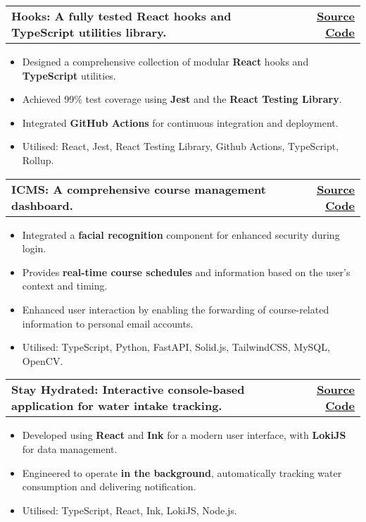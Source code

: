 \documentclass[a4paper,11pt]{article}
\makeatletter
\newcommand{\resumeItem}[1]{
  \item\small{
    {#1 \vspace{-2pt}}
  }
}
\newcommand{\resumeProjectHeading}[2]{
  \item
  \begin{tabular*}{1.001\textwidth}{l@{\extracolsep{\fill}}r}
    \small#1 & \textbf{\small #2}\\
  \end{tabular*}\vspace{-7pt}
}
\newcommand{\resumeItemListStart}{\begin{itemize}}
\newcommand{\resumeItemListEnd}{\end{itemize}\vspace{-5pt}}
\makeatother
\begin{document}
\resumeProjectHeading{\textbf{Hooks: A fully tested React hooks and TypeScript utilities library.}}{\href{https://github.com/chanyatfu/hooks}{\underline{Source Code}}}
\resumeItemListStart
\resumeItem{Designed a comprehensive collection of modular \textbf{React} hooks and \textbf{TypeScript} utilities.}
\resumeItem{Achieved 99\% test coverage using \textbf{Jest} and the \textbf{React Testing Library}.}
\resumeItem{Integrated \textbf{GitHub Actions} for continuous integration and deployment.}
\resumeItem{Utilised: React, Jest, React Testing Library, Github Actions, TypeScript, Rollup.}
\resumeItemListEnd
\vspace{-15pt}

\resumeProjectHeading{\textbf{ICMS: A comprehensive course management dashboard.}}{\href{https://github.com/chanyatfu/ICMS}{\underline{Source Code}}}
\resumeItemListStart
\resumeItem{Integrated a \textbf{facial recognition} component for enhanced security during login.}
\resumeItem{Provides \textbf{real-time course schedules} and information based on the user’s context and timing.}
\resumeItem{Enhanced user interaction by enabling the forwarding of course-related information to personal email accounts.}
\resumeItem{Utilised: TypeScript, Python, FastAPI, Solid.js, TailwindCSS, MySQL, OpenCV.}
\vspace{-15pt}
\resumeItemListEnd

\resumeProjectHeading{\textbf{Stay Hydrated: Interactive console-based application for water intake tracking.}}{\href{https://github.com/chanyatfu/stay-hydrated}{\underline{Source Code}}}
\resumeItemListStart
\resumeItem{Developed using \textbf{React} and \textbf{Ink} for a modern user interface, with \textbf{LokiJS} for data management.}
\resumeItem{Engineered to operate \textbf{in the background}, automatically tracking water consumption and delivering notification.}
\resumeItem{Utilised: TypeScript, React, Ink, LokiJS, Node.js.}
\resumeItemListEnd



\end{document}
